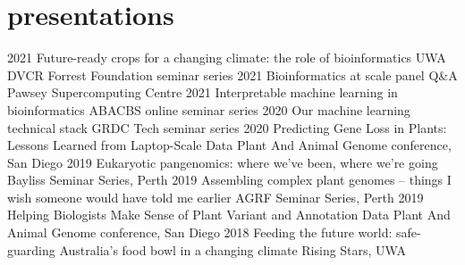 \documentclass[]{friggeri-cv} %
\begin{document}
\section{presentations}
\begin{entrylist}

\entry
{2021}
{Future-ready crops for a changing climate: the role of bioinformatics}
{}
{UWA DVCR Forrest Foundation seminar series}
\entry
{2021}
{Bioinformatics at scale panel Q\&A}
{}
{Pawsey Supercomputing Centre}
\entry
{2021}
{Interpretable machine learning in bioinformatics}
{}
{ABACBS online seminar series}
\entry
{2020}
{Our machine learning technical stack}
{}
{GRDC Tech seminar series}
\entry
{2020}
{Predicting Gene Loss in Plants: Lessons Learned from Laptop-Scale Data}
{}
{Plant And Animal Genome conference, San Diego}
\entry
{2019}
{Eukaryotic pangenomics: where we've been, where we're going}
{}
{Bayliss Seminar Series, Perth}
\entry
{2019}
{Assembling complex plant genomes – things I wish someone would have told me earlier}
{}
{AGRF Seminar Series, Perth}
\entry
{2019}
{Helping Biologists Make Sense of Plant Variant and Annotation Data}
{}
{Plant And Animal Genome conference, San Diego}
\entry
{2018}
{Feeding the future world: safe-guarding Australia’s food bowl in a changing climate}
{}
{Rising Stars, UWA}
\end{entrylist}
\end{document}
